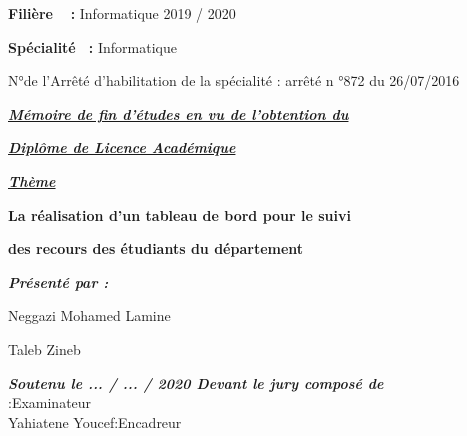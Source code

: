 \documentclass[12pt]{report}
\begin{document}
\begin{titlepage}
    \hspace{0.2in}
    \large{\textbf{Filière \quad\,\,\, :}  Informatique}
    \kern 2.65in
    2019 / 2020

    \hspace{0.2in}
    \large{\textbf{Spécialité \, :}  Informatique}

    \hspace{0.2in}
    \Large{N°de l’Arrêté d’habilitation de la spécialité : arrêté n °872 du 26/07/2016}

    \begin{center}
        \begin{large}

            \textit{\textbf{\uline{Mémoire de fin d'études en vu de l'obtention du}}}
        
            \textit{\textbf{\uline{Diplôme de Licence Académique}}}

        \end{large}

        \vspace{0.2in}

        \textit{\Huge{\textbf{\uline{Thème}}}}

        \begin{mdframed}[style=MyFrame]
            \begin{center}
            \color{BlueViolet}
              \LARGE{\textbf{La réalisation d'un tableau de bord pour le suivi}}

              \LARGE{\textbf{des recours des étudiants du département}}
            \end{center}
        \end{mdframed}
    \end{center}

    \vspace{-0.05in}

    \hspace{0.2in}
    \textit{\textbf{Présenté par :}}

    \hspace{0.2in}
    Neggazi Mohamed Lamine

    \hspace{0.2in}
    Taleb Zineb

    \begin{center}
        \vspace{-0.1in}
        \textit{\textbf{Soutenu le ... / ... / 2020 Devant le jury composé de}}\\
        \hspace{1.867in}
        \qquad :\qquad Examinateur\\
        Yahiatene Youcef\qquad :\qquad Encadreur
    \end{center}


\end{titlepage}
\end{document}
